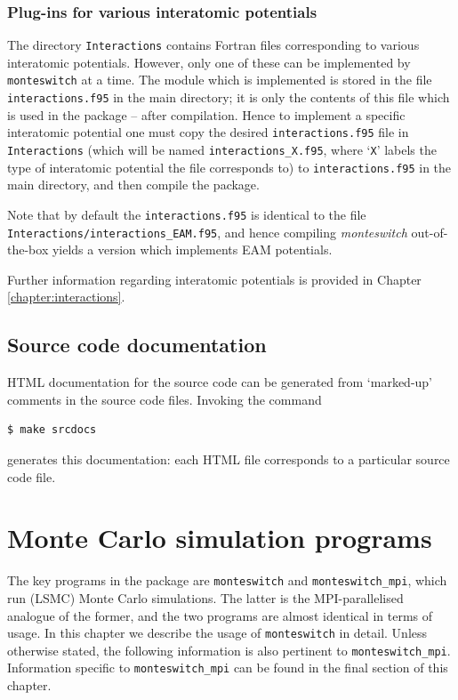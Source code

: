\documentclass{report}
\begin{document}
\subsection{Plug-ins for various interatomic potentials}\label{sec:plugins}
The directory \texttt{Interactions} contains Fortran files corresponding to various interatomic potentials. However, only one of these can be implemented 
by \texttt{monteswitch} at a time. The module which is implemented is stored in the file \texttt{interactions.f95} in the main directory; it is only the 
contents of this file which is used in the package -- after compilation. Hence to implement a specific interatomic potential one must copy
the desired \texttt{interactions.f95} file in \texttt{Interactions} (which will be named \texttt{interactions\_X.f95}, where `\texttt{X}' labels
the type of interatomic potential the file corresponds to) to \texttt{interactions.f95} in the main directory, and then compile the package.

Note that by default the \texttt{interactions.f95} is identical to the file \texttt{Interactions/interactions\_EAM.f95}, and hence compiling 
\emph{monteswitch} out-of-the-box yields a version which implements EAM potentials.

Further information regarding interatomic potentials is provided in Chapter \ref{chapter:interactions}.

\section{Source code documentation}
HTML documentation for the source code can be generated from `marked-up' comments in the source code files. Invoking the command 
\begin{verbatim}
$ make srcdocs
\end{verbatim}
generates this documentation: each HTML file corresponds to a particular source code file.


\chapter{Monte Carlo simulation programs}\label{chapter:simulation_programs}
The key programs in the package are \texttt{monteswitch} and \texttt{monteswitch\_mpi}, which run (LSMC) Monte Carlo simulations. 
The latter is the MPI-parallelised analogue of the former, and the two programs are almost identical in terms of usage.
In this chapter we describe the usage of \texttt{monteswitch} in detail. Unless otherwise stated, the following information
is also pertinent to \texttt{monteswitch\_mpi}. Information specific to \texttt{monteswitch\_mpi} can be found in 
the final section of this chapter.
\end{document}
